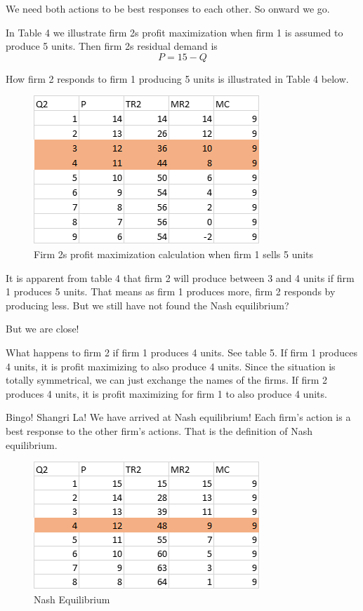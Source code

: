 \documentclass[
]{book}
\begin{document}
We need both actions to be best responses to each other. So onward we go.

In Table 4 we illustrate firm 2s profit maximization when firm 1 is assumed to produce 5 units. Then firm 2s residual demand is
\[P  =  15  -  Q\]

How firm 2 responds to firm 1 producing 5 units is illustrated in Table 4 below.

\begin{figure}

{\centering \includegraphics[width=0.5\linewidth]{img/oligopoly/fig4} 

}

\caption{Firm 2s profit maximization calculation when firm 1 sells 5 units}\label{fig:oligopoly04}
\end{figure}

It is apparent from table 4 that firm 2 will produce between 3 and 4 units if firm 1 produces 5 units. That means as firm 1 produces more, firm 2 responds by producing less. But we still have not found the Nash equilibrium?

But we are close!

What happens to firm 2 if firm 1 produces 4 units. See table 5. If firm 1 produces 4 units, it is profit maximizing to also produce 4 units. Since the situation is totally symmetrical, we can just exchange the names of the firms. If firm 2 produces 4 units, it is profit maximizing for firm 1 to also produce 4 units.

Bingo!
Shangri La!
We have arrived at Nash equilibrium! Each firm's action is a best response to the other firm's actions. That is the definition of Nash equilibrium.

\begin{figure}

{\centering \includegraphics[width=0.5\linewidth]{img/oligopoly/fig5} 

}

\caption{Nash Equilibrium}\label{fig:oligopoly05}
\end{figure}
\end{document}
